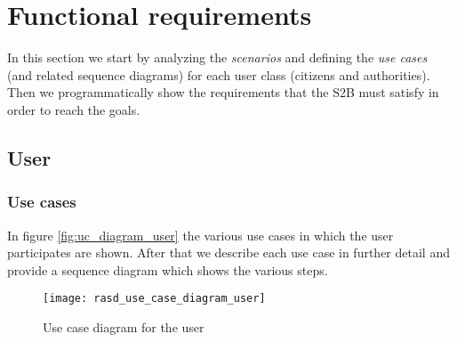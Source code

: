 \section{Functional requirements}
In this section we start by analyzing the \emph{scenarios} and defining
the \emph{use cases} (and related sequence diagrams) for each user class
(citizens and authorities).
Then we programmatically show the requirements that the S2B must satisfy in
order to reach the goals.

\subsection{User}


\subsubsection{Use cases}
In figure \vref{fig:uc_diagram_user} the various use cases in which the user
participates are shown.
After that we describe each use case in further detail and provide a sequence
diagram which shows the various steps.

\begin{figure}[h]
    \centering
    \texttt{[image: rasd\_use\_case\_diagram\_user]}
    \caption{Use case diagram for the user}
    \label{fig:uc_diagram_user}
\end{figure}

\clearpage



